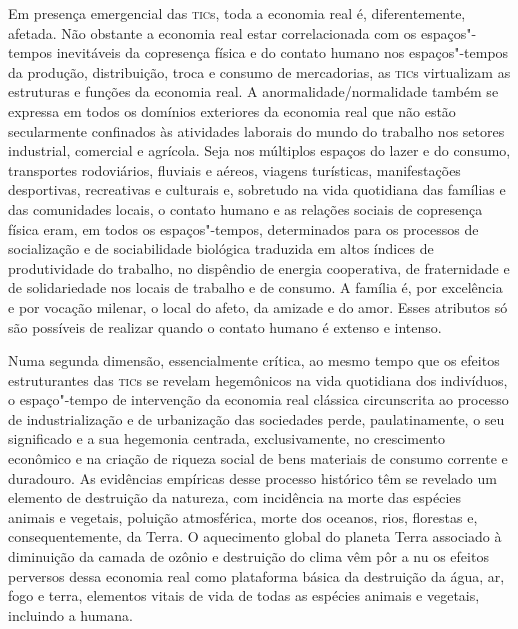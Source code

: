 Em presença emergencial das \textsc{tic}s, toda a economia real é,
diferentemente, afetada. Não obstante a economia real estar
correlacionada com os espaços"-tempos inevitáveis da copresença física e
do contato humano nos espaços"-tempos da produção, distribuição, troca e
consumo de mercadorias, as \textsc{tic}s virtualizam as estruturas e funções da
economia real. A anormalidade/normalidade também se expressa em todos os
domínios exteriores da economia real que não estão secularmente
confinados às atividades laborais do mundo do trabalho nos setores
industrial, comercial e agrícola. Seja nos múltiplos espaços do lazer e
do consumo, transportes rodoviários, fluviais e aéreos, viagens
turísticas, manifestações desportivas, recreativas e culturais e,
sobretudo na vida quotidiana das famílias e das comunidades locais, o
contato humano e as relações sociais de copresença física eram, em todos
os espaços"-tempos, determinados para os processos de socialização e de
sociabilidade biológica traduzida em altos índices de produtividade do
trabalho, no dispêndio de energia cooperativa, de fraternidade e de
solidariedade nos locais de trabalho e de consumo. A família é, por
excelência e por vocação milenar, o local do afeto, da amizade e do
amor. Esses atributos só são possíveis de realizar quando o contato
humano é extenso e intenso.

Numa segunda dimensão, essencialmente crítica, ao mesmo tempo que os
efeitos estruturantes das \textsc{tic}s se revelam hegemônicos na vida quotidiana
dos indivíduos, o espaço"-tempo de intervenção da economia real clássica
circunscrita ao processo de industrialização e de urbanização das
sociedades perde, paulatinamente, o seu significado e a sua hegemonia
centrada, exclusivamente, no crescimento econômico e na criação de
riqueza social de bens materiais de consumo corrente e duradouro. As
evidências empíricas desse processo histórico têm se revelado um
elemento de destruição da natureza, com incidência na morte das espécies
animais e vegetais, poluição atmosférica, morte dos oceanos, rios,
florestas e, consequentemente, da Terra. O aquecimento global do planeta
Terra associado à diminuição da camada de ozônio e destruição do clima
vêm pôr a nu os efeitos perversos dessa economia real como plataforma
básica da destruição da água, ar, fogo e terra, elementos vitais de vida
de todas as espécies animais e vegetais, incluindo a humana.

